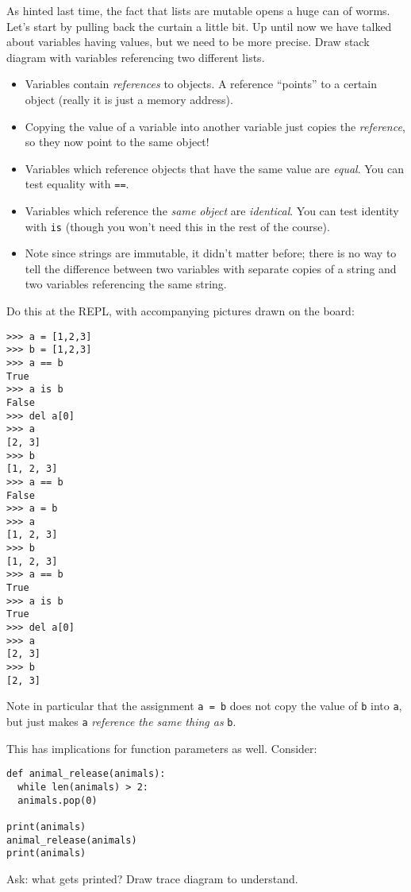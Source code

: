 \documentclass{article}
\begin{document}
As hinted last time, the fact that lists are mutable opens a huge can
of worms.  Let's start by pulling back the curtain a little bit.  Up
until now we have talked about variables having values, but we need to
be more precise.  Draw stack diagram with variables referencing two
different lists.

\begin{itemize}
\item Variables contain \emph{references} to objects.  A reference
  ``points'' to a certain object (really it is just a memory address).
\item Copying the value of a variable into another variable just
  copies the \emph{reference}, so they now point to the same object!
\item Variables which reference objects that have the same value are
  \emph{equal}.  You can test equality with \verb|==|.
\item Variables which reference the \emph{same object} are
  \emph{identical}. You can test identity with \verb|is| (though you
  won't need this in the rest of the course).
\item Note since strings are immutable, it didn't matter before; there
  is no way to tell the difference between two variables with separate
  copies of a string and two variables referencing the same string.
\end{itemize}

Do this at the REPL, with accompanying pictures drawn on the board:
\begin{verbatim}
>>> a = [1,2,3]
>>> b = [1,2,3]
>>> a == b
True
>>> a is b
False
>>> del a[0]
>>> a
[2, 3]
>>> b
[1, 2, 3]
>>> a == b
False
>>> a = b
>>> a
[1, 2, 3]
>>> b
[1, 2, 3]
>>> a == b
True
>>> a is b
True
>>> del a[0]
>>> a
[2, 3]
>>> b
[2, 3]
\end{verbatim}
Note in particular that the assignment \verb|a = b| does not copy the
value of \verb|b| into \verb|a|, but just makes \verb|a|
\emph{reference the same thing as} \verb|b|.

This has implications for function parameters as well.  Consider:

\begin{verbatim}
def animal_release(animals):
  while len(animals) > 2:
  animals.pop(0)

print(animals)
animal_release(animals)
print(animals)
\end{verbatim}

Ask: what gets printed?  Draw trace diagram to understand.
\end{document}
